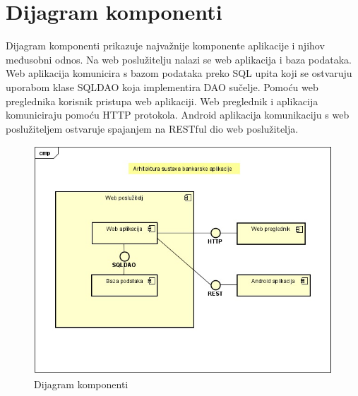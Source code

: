 	\eject
	
		\section{Dijagram komponenti}
		
			Dijagram komponenti prikazuje najvažnije komponente aplikacije i njihov međusobni odnos. Na web poslužitelju nalazi se web aplikacija i baza podataka. Web aplikacija komunicira s bazom podataka preko SQL upita koji se ostvaruju uporabom klase SQLDAO koja implementira DAO sučelje. Pomoću web preglednika korisnik pristupa web aplikaciji. Web preglednik i aplikacija komuniciraju pomoću HTTP protokola. Android aplikacija komunikaciju s web poslužiteljem ostvaruje spajanjem na RESTful dio web poslužitelja.
		
			 \begin{figure}[H]
			 	\includegraphics[scale=0.65]{Slike/DijagramKomponenti.jpg}
			 	\centering
			 	\caption{Dijagram komponenti}
			 	\label{fig:dijagram}
			 \end{figure}